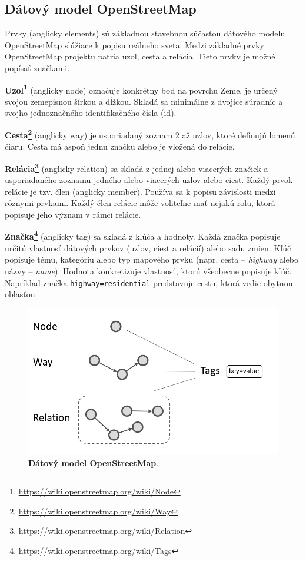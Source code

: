 \subsection{Dátový model OpenStreetMap}
Prvky (anglicky elements) sú základnou stavebnou súčasťou dátového modelu OpenStreetMap slúžiace k popisu reálneho sveta. Medzi základné prvky OpenStreetMap projektu patria uzol, cesta a relácia. Tieto prvky je možné popísať značkami.

\textbf{Uzol\footnote{\url{https://wiki.openstreetmap.org/wiki/Node}}} (anglicky node) označuje konkrétny bod na povrchu Zeme, je určený svojou zemepisnou šírkou a dĺžkou. Skladá sa minimálne z dvojice súradníc a svojho jednoznačného identifikačného čísla (id).

\textbf{Cesta\footnote{\url{https://wiki.openstreetmap.org/wiki/Way}}} (anglicky way) je usporiadaný zoznam 2 až  uzlov, ktoré definujú lomenú čiaru. Cesta má aspoň jednu značku alebo je vložená do relácie.

\textbf{Relácia\footnote{\url{https://wiki.openstreetmap.org/wiki/Relation}}} (anglicky relation) sa skladá z jednej alebo viacerých značiek a usporiadaného zoznamu jedného alebo viacerých uzlov alebo ciest. Každý prvok relácie je tzv. člen (anglicky member). Používa sa k popisu závislosti medzi rôznymi prvkami. Každý člen relácie môže voliteľne mať nejakú rolu, ktorá popisuje jeho význam v rámci relácie.

\textbf{Značka\footnote{\url{https://wiki.openstreetmap.org/wiki/Tags}}} (anglicky tag) sa skladá z kľúča a hodnoty. Každá značka popisuje určitú vlastnosť dátových prvkov (uzlov, ciest a relácií) alebo sadu zmien. Kľúč popisuje tému, kategóriu alebo typ mapového prvku (napr. cesta \--- \emph{highway} alebo názvy \--- \emph{name}). Hodnota konkretizuje vlastnosť, ktorú všeobecne popisuje kľúč. Napríklad značka \texttt{highway=residential} predstavuje cestu, ktorá vedie obytnou oblasťou.

\begin{figure}[ht]
    \centering
    \includegraphics[width=0.64\linewidth]{obrazky-figures/openstreetmap-datamodel.png}
    \caption{\textbf{Dátový model OpenStreetMap}\protect\footnotemark.}
    \label{fig:osmdatamodel}
\end{figure}


